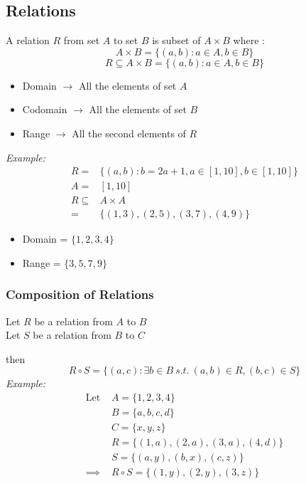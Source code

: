 \documentclass[11pt,letterpaper]{article}
\newenvironment{example}                             
        {\textit{Example:}\\}
	{}
\begin{document}
\subsection{Relations}
A relation $R$ from set $A$ to set $B$ is subset of $A\times B$ where :
\[
  A\times B = \{(a,b) : a\in A, b\in B\}
\]
\[
  R \subseteq A \times B = \{(a,b) : a\in A, b\in B\}
\]

\begin{itemize}
  \item Domain $\rightarrow$ All the elements of set $A$
  \item Codomain $\rightarrow$ All the elements of set $B$
  \item Range $\rightarrow$ All the second elements of $R$
\end{itemize}
\begin{example}
  \begin{align*}
    R = & \{ (a,b) : b = 2a + 1, a \in [1,10] , b \in [1,10]\}\\
    A = & [1,10]\\
    R \subseteq & A \times A\\
    = & \{(1,3),(2,5),(3,7),(4,9)\}
  \end{align*}
  \begin{itemize}
    \item Domain = $\{1,2,3,4\}$
    \item Range = $\{3,5,7,9\}$
  \end{itemize}
\end{example}
\subsubsection{Composition of Relations}
Let $R$ be a relation from $A$ to $B$\\
Let $S$ be a relation from $B$ to $C$

then 
\[
  R \circ S = \{(a,c) : \exists b \in B \ s.t.\ (a,b) \in R, (b,c) \in S\}
\]
\begin{example}
  \begin{align*}
    \text{Let } & A = \{1,2,3,4\} \\
        & B = \{a,b,c,d\} \\
        & C = \{x,y,z\}\\
        & R = \{(1,a), (2,a), (3,a), (4,d)\}\\
        & S = \{(a,y), (b,x), (c,z)\}\\
    \implies & R \circ S = \{(1,y), (2,y), (3,z)\}
  \end{align*}
\end{example}
\end{document}
